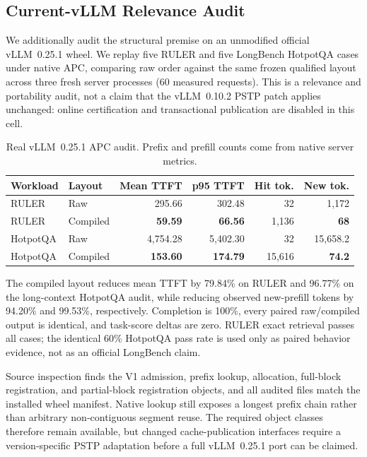 \subsection{Current-vLLM Relevance Audit}
\label{app:vllm025}

We additionally audit the structural premise on an unmodified official
vLLM~0.25.1 wheel.  We replay five RULER and five LongBench HotpotQA cases under
native APC, comparing raw order against the same frozen qualified layout across
three fresh server processes (60 measured requests).  This is a relevance and
portability audit, not a claim that the vLLM~0.10.2 PSTP patch applies unchanged:
online certification and transactional publication are disabled in this cell.

\begin{table}[t]
\centering
\caption{Real vLLM~0.25.1 APC audit.  Prefix and prefill counts come from native
server metrics.}
\label{tab:vllm025}
\small
\begin{tabular}{llrrrr}
\toprule
Workload & Layout & Mean TTFT & p95 TTFT & Hit tok. & New tok. \\
\midrule
RULER & Raw & 295.66 & 302.48 & 32 & 1,172 \\
RULER & Compiled & \textbf{59.59} & \textbf{66.56} & 1,136 & \textbf{68} \\
HotpotQA & Raw & 4,754.28 & 5,402.30 & 32 & 15,658.2 \\
HotpotQA & Compiled & \textbf{153.60} & \textbf{174.79} & 15,616 & \textbf{74.2} \\
\bottomrule
\end{tabular}
\end{table}

The compiled layout reduces mean TTFT by 79.84\% on RULER and 96.77\% on the
long-context HotpotQA audit, while reducing observed new-prefill tokens by
94.20\% and 99.53\%, respectively.  Completion is 100\%, every paired
raw/compiled output is identical, and task-score deltas are zero.  RULER exact
retrieval passes all cases; the identical 60\% HotpotQA pass rate is used only
as paired behavior evidence, not as an official LongBench claim.

Source inspection finds the V1 admission, prefix lookup, allocation, full-block
registration, and partial-block registration objects, and all audited files
match the installed wheel manifest.  Native lookup still exposes a longest
prefix chain rather than arbitrary non-contiguous segment reuse.  The required
object classes therefore remain available, but changed cache-publication
interfaces require a version-specific PSTP adaptation before a full
vLLM~0.25.1 port can be claimed.
